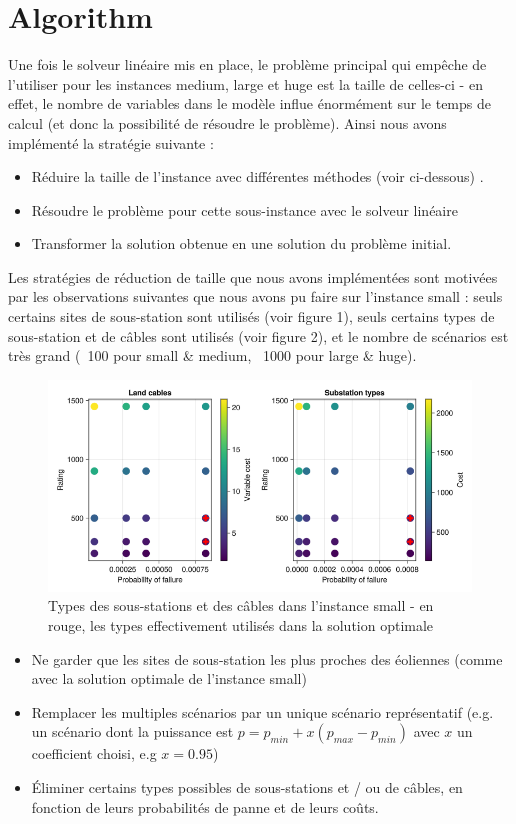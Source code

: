 \documentclass[a4paper,12pt]{article}
\begin{document}
\section {Algorithm}
Une fois le solveur linéaire mis en place, le problème principal qui empêche de l'utiliser pour les instances medium, large et huge est la taille de celles-ci - en effet, le nombre de variables dans le modèle influe énormément sur le temps de calcul (et donc la possibilité de résoudre le problème). 
Ainsi nous avons implémenté la stratégie suivante :
\\
\begin{itemize}
    \item Réduire la taille de l'instance avec différentes méthodes (voir ci-dessous) .
    \item Résoudre le problème pour cette sous-instance avec le solveur linéaire
    \item Transformer la solution obtenue en une solution du problème initial. \\
\end{itemize}
Les stratégies de réduction de taille que nous avons implémentées sont motivées par les observations suivantes que nous avons pu faire sur l'instance small :
seuls certains sites de sous-station sont utilisés (voir figure 1), seuls certains types de sous-station et de câbles sont utilisés (voir figure 2), et le nombre de scénarios est très grand (~100 pour small \& medium, ~1000 pour large \& huge).

\begin{figure}[h]
    \centering
    \includegraphics[scale=0.4]{small-types.png}
    \caption{Types des sous-stations et des câbles dans l'instance small - en rouge, les types effectivement utilisés dans la solution optimale}
\end{figure}

\begin{itemize}
    \item Ne garder que les sites de sous-station les plus proches des éoliennes (comme avec la solution optimale de l'instance small)
    \item Remplacer les multiples scénarios par un unique scénario représentatif (e.g. un scénario dont la puissance est $p = p_{min} + x(p_{max} - p_{min})$ avec $x$ un coefficient choisi, e.g $x = 0.95$)
    \item Éliminer certains types possibles de sous-stations et / ou de câbles, en fonction de leurs probabilités de panne et de leurs coûts.
\end{itemize}
\end{document}
